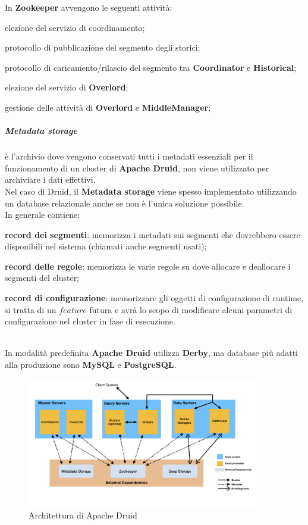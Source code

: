 In \textbf{Zookeeper} avvengono le seguenti attività:
\begin{list}{*}
    \item elezione del servizio di coordinamento;
    \item protocollo di pubblicazione del segmento degli storici;
    \item protocollo di caricamento/rilascio del segmento tra \textbf{Coordinator} e \textbf{Historical};
    \item elezione del servizio di \textbf{Overlord};
    \item gestione delle attività di \textbf{Overlord} e \textbf{MiddleManager};
\end{list}
\subparagraph{Metadata storage} è l’archivio dove vengono conservati tutti i \gls{metadati}{} essenziali
per il funzionamento di un \gls{cluster}{} di \textbf{Apache Druid}, non viene utilizzato per archiviare i dati effettivi.\\
Nel caso di Druid, il \textbf{Metadata storage} viene spesso implementato utilizzando un database relazionale anche se non è l'unica soluzione possibile.\\ 
In generale contiene:
\begin{list}{*}
    \item \textbf{record dei segmenti}: memorizza i \gls{metadati}{} sui segmenti che dovrebbero
    essere disponibili nel sistema (chiamati anche segmenti usati);
    \item \item \textbf{record delle regole}: memorizza le varie regole su dove allocare e deallocare i segmenti del cluster;
    \item \textbf{record di configurazione}: memorizzare gli oggetti di configurazione
    di runtime, si tratta di un $feature$ futura e avrà lo scopo di modificare alcuni parametri di configurazione nel \gls{cluster}{} in
    fase di esecuzione.
\end{list}
\noindent
\\
In modalità predefinita \textbf{Apache Druid} utilizza \textbf{Derby}, ma database più adatti alla produzione
sono \textbf{MySQL} e \textbf{PostgreSQL}.

\begin{figure}[ht]   
    \centering
    \includegraphics[width=0.9\textwidth]{images/componenti/druid_architectcture.png}
    \caption{Architettura di Apache Druid}
    \label{fig:druid_architecture}
\end{figure}

